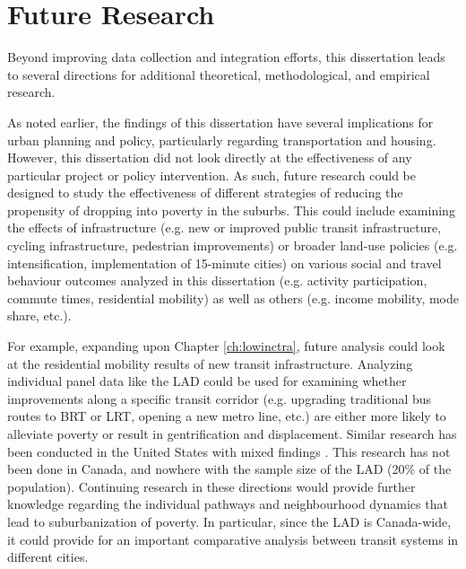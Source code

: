\section{Future Research}

Beyond improving data collection and integration efforts, this dissertation leads to several directions for additional theoretical, methodological, and empirical research. 

As noted earlier, the findings of this dissertation have several implications for urban planning and policy, particularly regarding transportation and housing. However, this dissertation did not look directly at the effectiveness of any particular project or policy intervention. As such, future research could be designed to study the effectiveness of different strategies of reducing the propensity of dropping into poverty in the suburbs. This could include examining the effects of infrastructure (e.g. new or improved public transit infrastructure, cycling infrastructure, pedestrian improvements) or broader land-use policies (e.g. intensification, implementation of 15-minute cities) on various social and travel behaviour outcomes analyzed in this dissertation (e.g. activity participation, commute times, residential mobility) as well as others (e.g. income mobility, mode share, etc.).

For example, expanding upon Chapter \ref{ch:lowinctra}, future analysis could look at the residential mobility results of new transit infrastructure. Analyzing individual panel data like the LAD could be used for examining whether improvements along a specific transit corridor (e.g. upgrading traditional bus routes to BRT or LRT, opening a new metro line, etc.) are either more likely to alleviate poverty or result in gentrification and displacement. Similar research has been conducted in the United States with mixed findings \cite{delmelle_new_2020, delmelle_transit-induced_2021}. This research has not been done in Canada, and nowhere with the sample size of the LAD (20\% of the population). Continuing research in these directions would provide further knowledge regarding the individual pathways and neighbourhood dynamics that lead to suburbanization of poverty. In particular, since the LAD is Canada-wide, it could provide for an important comparative analysis between transit systems in different cities.

